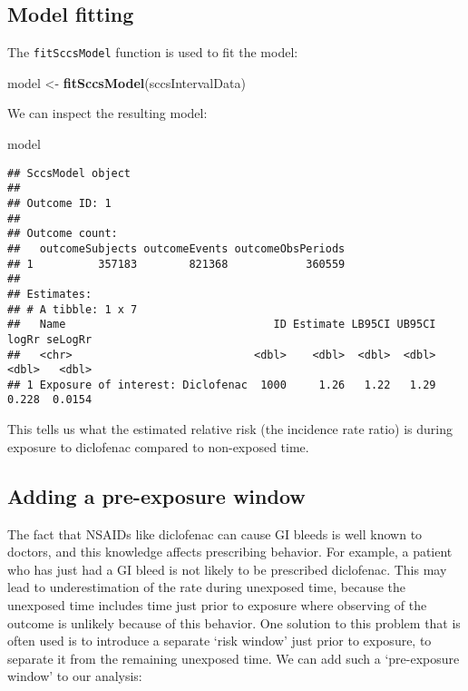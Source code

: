 \documentclass[
]{article}
\newenvironment{Shaded}{\begin{snugshade}}{\end{snugshade}}
\newcommand{\KeywordTok}[1]{\textcolor[rgb]{0.13,0.29,0.53}{\textbf{#1}}}
\newcommand{\NormalTok}[1]{#1}
\newcommand{\StringTok}[1]{\textcolor[rgb]{0.31,0.60,0.02}{#1}}
\begin{document}
\hypertarget{model-fitting}{%
\subsection{Model fitting}\label{model-fitting}}

The \texttt{fitSccsModel} function is used to fit the model:

\begin{Shaded}
\begin{Highlighting}[]
\NormalTok{model <-}\StringTok{ }\KeywordTok{fitSccsModel}\NormalTok{(sccsIntervalData)}
\end{Highlighting}
\end{Shaded}

We can inspect the resulting model:

\begin{Shaded}
\begin{Highlighting}[]
\NormalTok{model}
\end{Highlighting}
\end{Shaded}

\begin{verbatim}
## SccsModel object
## 
## Outcome ID: 1
## 
## Outcome count:
##   outcomeSubjects outcomeEvents outcomeObsPeriods
## 1          357183        821368            360559
## 
## Estimates:
## # A tibble: 1 x 7
##   Name                                ID Estimate LB95CI UB95CI logRr seLogRr
##   <chr>                            <dbl>    <dbl>  <dbl>  <dbl> <dbl>   <dbl>
## 1 Exposure of interest: Diclofenac  1000     1.26   1.22   1.29 0.228  0.0154
\end{verbatim}

This tells us what the estimated relative risk (the incidence rate
ratio) is during exposure to diclofenac compared to non-exposed time.

\hypertarget{adding-a-pre-exposure-window}{%
\subsection{Adding a pre-exposure
window}\label{adding-a-pre-exposure-window}}

The fact that NSAIDs like diclofenac can cause GI bleeds is well known
to doctors, and this knowledge affects prescribing behavior. For
example, a patient who has just had a GI bleed is not likely to be
prescribed diclofenac. This may lead to underestimation of the rate
during unexposed time, because the unexposed time includes time just
prior to exposure where observing of the outcome is unlikely because of
this behavior. One solution to this problem that is often used is to
introduce a separate `risk window' just prior to exposure, to separate
it from the remaining unexposed time. We can add such a `pre-exposure
window' to our analysis:
\end{document}
